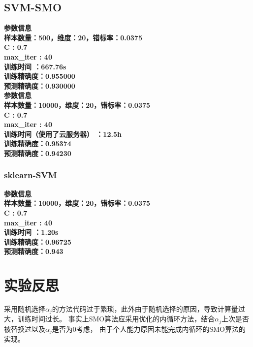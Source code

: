 \documentclass[12pt, a4paper, oneside]{ctexart}
\begin{document}
\subsection*{SVM-SMO}
\textbf{参数信息}\\
\textbf{样本数量：500，维度：20，错标率：0.0375}\\
\textbf{C : 0.7\\max\_iter : 40}\\
\textbf{训练时间 ：667.76s}\\
\textbf{训练精确度：0.955000}\\
\textbf{预测精确度：0.930000}\\

\textbf{参数信息}\\
\textbf{样本数量：10000，维度：20，错标率：0.0375}\\
\textbf{C : 0.7\\max\_iter : 40}\\
\textbf{训练时间（使用了云服务器） ：12.5h}\\
\textbf{训练精确度：0.95374}\\
\textbf{预测精确度：0.94230}

\subsubsection*{sklearn-SVM}
\textbf{参数信息}\\
\textbf{样本数量：10000，维度：20，错标率：0.0375}\\
\textbf{C : 0.7\\max\_iter : 40}\\
\textbf{训练时间 ：1.20s}\\
\textbf{训练精确度：0.96725}\\
\textbf{预测精确度：0.943}
\section*{实验反思}
采用随机选择$\alpha_{j}$的方法代码过于繁琐，此外由于随机选择的原因，导致计算量过大，训练时间过长。
事实上SMO算法应采用优化的内循环方法，结合$\alpha_{j}$上次是否被替换过以及$\alpha_{j}$是否为0考虑，
由于个人能力原因未能完成内循环的SMO算法的实现。
\end{document}
